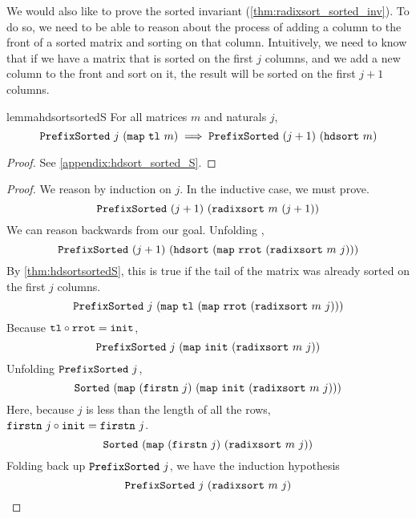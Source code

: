 \documentclass[sigplan,10pt,anonymous,review]{thesis}
\begin{document}
We would also like to prove the sorted invariant
(\cref{thm:radixsort_sorted_inv}). To do so, we need to be able to
reason about the process of adding a column to the front of a sorted
matrix and sorting on that column. Intuitively, we need to know that
if we have a matrix that is sorted on the first $j$ columns, and we
add a new column to the front and sort on it, the result will be
sorted on the first $j+1$ columns.
\begin{restatable}{lemma}{hdsortsortedS}
  \label{thm:hdsortsortedS}
  For all matrices $m$ and naturals $j$,
  \begin{equation*}
    \texttt{\textup{PrefixSorted}}~j~(\texttt{\textup{map}}~\texttt{\textup{tl}}~m) \implies
    \texttt{\textup{PrefixSorted}}~(j+1)~(\texttt{\textup{hdsort}}~m)
  \end{equation*}
\end{restatable}
\begin{proof}
  See \cref{appendix:hdsort_sorted_S}.
\end{proof}

\radixsortsortedinv
\begin{proof}
  We reason by induction on $j$. In the inductive case, we must prove.
  \begin{equation*}
    \texttt{\textup{PrefixSorted}}~(j+1)~(\texttt{\textup{radixsort}}~m~(j+1))
  \end{equation*}
  We can reason backwards from our goal. Unfolding ,
  \begin{equation*}
    \texttt{\textup{PrefixSorted}}~(j+1)~(\texttt{\textup{hdsort}}~(\texttt{\textup{map}}~\texttt{\textup{rrot}}~(\texttt{\textup{radixsort}}~m~j)))
  \end{equation*}
  By \cref{thm:hdsortsortedS}, this is true if the tail of the matrix
  was already sorted on the first $j$ columns.
  \begin{equation*}
    \texttt{\textup{PrefixSorted}}~j~(\texttt{\textup{map}}~\texttt{\textup{tl}}~(\texttt{\textup{map}}~\texttt{\textup{rrot}}~(\texttt{\textup{radixsort}}~m~j)))
  \end{equation*}
  Because $\texttt{\textup{tl}} \circ \texttt{\textup{rrot}} = \texttt{\textup{init}}$,
  \begin{equation*}
    \texttt{\textup{PrefixSorted}}~j~(\texttt{\textup{map}}~\texttt{\textup{init}}~(\texttt{\textup{radixsort}}~m~j))
  \end{equation*}
  Unfolding $\texttt{\textup{PrefixSorted}}~j$,
  \begin{equation*}
    \texttt{\textup{Sorted}}~(\texttt{\textup{map}}~(\texttt{\textup{firstn}}~j)~(\texttt{\textup{map}}~\texttt{\textup{init}}~(\texttt{\textup{radixsort}}~m~j)))
  \end{equation*}
  Here, because $j$ is less than the length of all the rows,
  $\texttt{\textup{firstn}}~j \circ \texttt{\textup{init}} = \texttt{\textup{firstn}}~j$.
  \begin{equation*}
    \texttt{\textup{Sorted}}~(\texttt{\textup{map}}~(\texttt{\textup{firstn}}~j)~(\texttt{\textup{radixsort}}~m~j))
  \end{equation*}
  Folding back up $\texttt{\textup{PrefixSorted}}~j$, we have the induction hypothesis
  \begin{equation*}
    \texttt{\textup{PrefixSorted}}~j~(\texttt{\textup{radixsort}}~m~j) \qedhere
  \end{equation*}
\end{proof}
\end{document}
